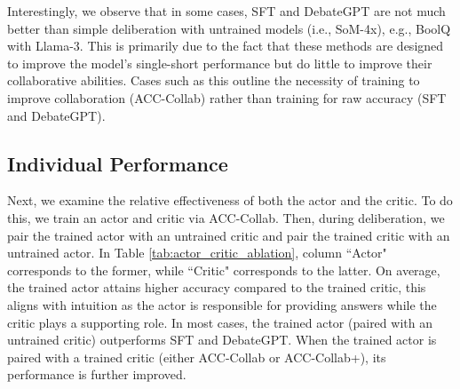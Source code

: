 Interestingly, we observe that in some cases, SFT and DebateGPT are not much better than simple deliberation with untrained models (i.e., SoM-4x), e.g., BoolQ with Llama-3.
This is primarily due to the fact that these methods are designed to improve the model's single-short performance but do little to improve their collaborative abilities. 
Cases such as this outline the necessity of training to improve collaboration (ACC-Collab) rather than training for raw accuracy (SFT and DebateGPT).














\subsection{Individual Performance}
Next, we examine the relative effectiveness of both the actor and the critic. 
To do this, we train an actor and critic via ACC-Collab.
Then, during deliberation, we pair the trained actor with an untrained critic and pair the trained critic with an untrained actor. 
In Table \ref{tab:actor_critic_ablation}, column ``Actor" corresponds to the former, while ``Critic" corresponds to the latter.
On average, the trained actor attains higher accuracy compared to the trained critic, this aligns with intuition as the actor is responsible for providing answers while the critic plays a supporting role.
In most cases, the trained actor (paired with an untrained critic) outperforms SFT and DebateGPT. 
When the trained actor is paired with a trained critic (either ACC-Collab or ACC-Collab+), its performance is further improved.




